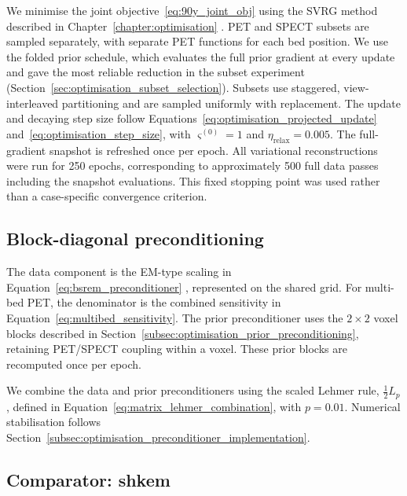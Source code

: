 We minimise the joint objective~\eqref{eq:90y_joint_obj} using the SVRG method described in Chapter~\ref{chapter:optimisation} \cite{johnsonAcceleratingStochasticGradient2013}. PET and SPECT subsets are sampled separately, with separate PET functions for each bed position. We use the folded prior schedule, which evaluates the full prior gradient at every update and gave the most reliable reduction in the subset experiment (Section~\ref{sec:optimisation_subset_selection}). Subsets use staggered, view-interleaved partitioning and are sampled uniformly with replacement.
The update and decaying step size follow Equations~\eqref{eq:optimisation_projected_update} and~\eqref{eq:optimisation_step_size}, with $\varsigma^{(0)}=1$ and $\eta_{\mathrm{relax}}=0.005$. The full-gradient snapshot is refreshed once per epoch. All variational reconstructions were run for 250 epochs, corresponding to approximately 500 full data passes including the snapshot evaluations. This fixed stopping point was used rather than a case-specific convergence criterion.

\subsection{Block-diagonal preconditioning}
\label{subsec:90y_precond}

The data component is the EM-type scaling in Equation~\eqref{eq:bsrem_preconditioner} \cite{depierroFastEMlikeMethods2001,ahn_globally_2003}, represented on the shared grid. For multi-bed PET, the denominator is the combined sensitivity in Equation~\eqref{eq:multibed_sensitivity}. The prior preconditioner uses the $2\times2$ voxel blocks described in Section~\ref{subsec:optimisation_prior_preconditioning}, retaining PET/SPECT coupling within a voxel. These prior blocks are recomputed once per epoch.

We combine the data and prior preconditioners using the scaled Lehmer rule, $\tfrac12 L_p$, defined in Equation~\eqref{eq:matrix_lehmer_combination}, with $p=0.01$. Numerical stabilisation follows Section~\ref{subsec:optimisation_preconditioner_implementation}.

\subsection{Comparator: \acrfull{shkem}}
\label{subsec:90y_shkem}

